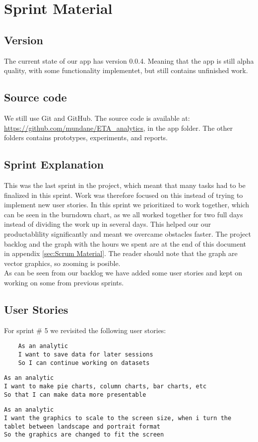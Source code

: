 \section{Sprint Material} %
\label{sec:Sprint Material}
\subsection{Version} %
\label{sub:Version}
The current state of our app has version 0.0.4. Meaning that the app is still alpha quality, with some functionality implementet, but still contains unfinished work.
\subsection{Source code} %
\label{sub:Source code}
We still use Git and GitHub. The source code is available at: \url{https://github.com/mundane/ETA_analytics}, in the app folder. The other folders contains prototypes, experiments, and reports.
\subsection{Sprint Explanation}%
This was the last sprint in the project, which meant that many tasks had to be finalized in this sprint. Work was therefore focused on this instead of trying to implement new user stories.
In this sprint we prioritized to work together, which can be seen in the burndown chart, as we all worked together for two full days instead of dividing the work up in several days. This helped our our productablility significantly and meant we overcame obstacles faster.
The project backlog and the graph with the hours we spent are at the end of this document in appendix \ref{sec:Scrum Material}. The reader should note that the graph are vector graphics, so zooming is posible. \\
As can be seen from our backlog we have added some user stories and kept on working on some from previous sprints.
\subsection{User Stories}
For sprint \# 5 we revisited the following user stories: \\
\begin{verbatim}
	As an analytic
	I want to save data for later sessions
	So I can continue working on datasets
\end{verbatim}
\begin{verbatim}
As an analytic
I want to make pie charts, column charts, bar charts, etc
So that I can make data more presentable
\end{verbatim}
\begin{verbatim}
As an analytic
I want the graphics to scale to the screen size, when i turn the tablet between landscape and portrait format
So the graphics are changed to fit the screen
\end{verbatim}

